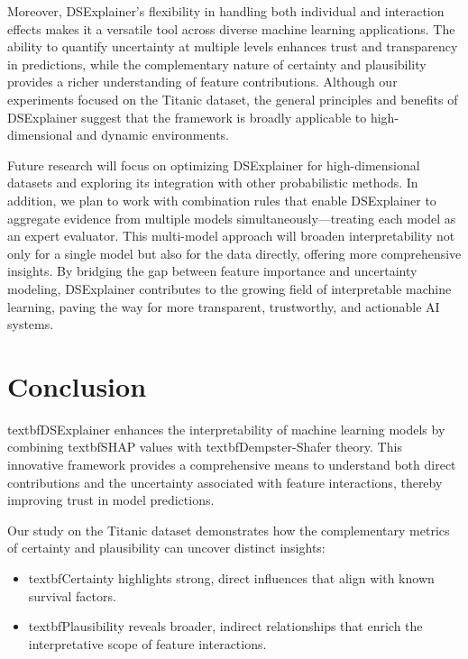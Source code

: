\documentclass[acmlarge]{acmart}
\begin{document}
Moreover, DSExplainer’s flexibility in handling both individual and interaction effects makes it a versatile tool across diverse machine learning applications. The ability to quantify uncertainty at multiple levels enhances trust and transparency in predictions, while the complementary nature of certainty and plausibility provides a richer understanding of feature contributions. Although our experiments focused on the Titanic dataset, the general principles and benefits of DSExplainer suggest that the framework is broadly applicable to high-dimensional and dynamic environments.

Future research will focus on optimizing DSExplainer for high-dimensional datasets and exploring its integration with other probabilistic methods. In addition, we plan to work with combination rules that enable DSExplainer to aggregate evidence from multiple models simultaneously—treating each model as an expert evaluator. This multi-model approach will broaden interpretability not only for a single model but also for the data directly, offering more comprehensive insights. By bridging the gap between feature importance and uncertainty modeling, DSExplainer contributes to the growing field of interpretable machine learning, paving the way for more transparent, trustworthy, and actionable AI systems.

\section{Conclusion}
\label{sec:conclusion}

textbf{DSExplainer} enhances the interpretability of machine learning models by combining textbf{SHAP values} with textbf{Dempster-Shafer theory}. This innovative framework provides a comprehensive means to understand both direct contributions and the uncertainty associated with feature interactions, thereby improving trust in model predictions.

Our study on the Titanic dataset demonstrates how the complementary metrics of certainty and plausibility can uncover distinct insights:
\begin{itemize}
    \item textbf{Certainty} highlights strong, direct influences that align with known survival factors.
    \item textbf{Plausibility} reveals broader, indirect relationships that enrich the interpretative scope of feature interactions.
\end{itemize}
\end{document}
